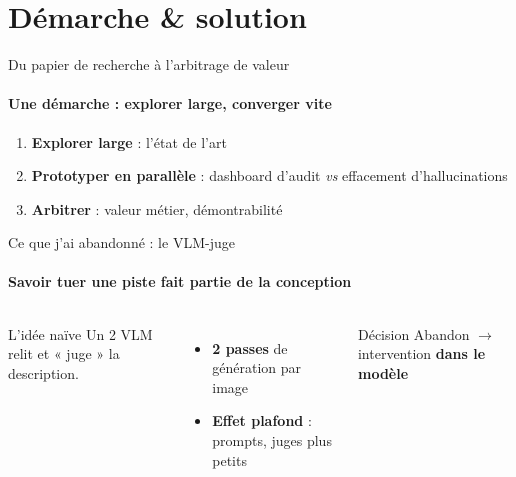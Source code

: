 \section{Démarche \& solution}

\begin{frame}{Du papier de recherche à l'arbitrage de valeur}
  \framesubtitle{Une démarche : explorer large, converger vite}
  \begin{enumerate}
    \item \textbf{Explorer large} : l'état de l'art
    \item \textbf{Prototyper en parallèle} : dashboard d'audit \textit{vs} effacement d'hallucinations
    \item \textbf{Arbitrer} : valeur métier, démontrabilité
  \end{enumerate}
  \vspace{0.3cm}
  \centering
  \begin{minipage}{0.86\textwidth}
  \end{minipage}
\end{frame}

\begin{frame}{Ce que j'ai abandonné : le VLM-juge}
  \framesubtitle{Savoir tuer une piste fait partie de la conception}
  \begin{columns}[T,onlytextwidth]
      \begin{block}{L'idée naïve}
        \small Un 2 VLM relit et « juge » la description.
      \end{block}
      \vspace{0.25cm}
      \begin{itemize}
        \item \textbf{2 passes} de génération par image
        \item \textbf{Effet plafond} : prompts, juges plus petits
      \end{itemize}
      \vspace{0.2cm}
      \vspace{0.2cm}
      \begin{alertblock}{Décision}
        \small Abandon $\rightarrow$ intervention \textbf{dans le modèle}
      \end{alertblock}
  \end{columns}
\end{frame}

